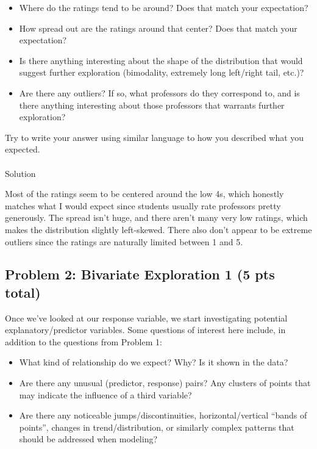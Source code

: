 \documentclass[
  letterpaper,
  DIV=11,
  numbers=noendperiod]{scrartcl}
\makeatletter
\let\oldparagraph\paragraph
\renewcommand{\paragraph}{
    \@ifstar
      \xxxParagraphStar
      \xxxParagraphNoStar
  }
\newcommand{\xxxParagraphStar}[1]{\oldparagraph*{#1}\mbox{}}
\newcommand{\xxxParagraphNoStar}[1]{\oldparagraph{#1}\mbox{}}
\providecommand{\tightlist}{%
  \setlength{\itemsep}{0pt}\setlength{\parskip}{0pt}}
\makeatother
\begin{document}
\begin{itemize}
\tightlist
\item
  Where do the ratings tend to be around? Does that match your
  expectation?
\item
  How spread out are the ratings around that center? Does that match
  your expectation?
\item
  Is there anything interesting about the shape of the distribution that
  would suggest further exploration (bimodality, extremely long
  left/right tail, etc.)?
\item
  Are there any outliers? If so, what professors do they correspond to,
  and is there anything interesting about those professors that warrants
  further exploration?
\end{itemize}

Try to write your answer using similar language to how you described
what you expected.

\paragraph{Solution}\label{solution-3}

Most of the ratings seem to be centered around the low 4s, which
honestly matches what I would expect since students usually rate
professors pretty generously. The spread isn't huge, and there aren't
many very low ratings, which makes the distribution slightly
left-skewed. There also don't appear to be extreme outliers since the
ratings are naturally limited between 1 and 5.

\subsection{Problem 2: Bivariate Exploration 1 (5 pts
total)}\label{problem-2-bivariate-exploration-1-5-pts-total}

Once we've looked at our response variable, we start investigating
potential explanatory/predictor variables. Some questions of interest
here include, in addition to the questions from Problem 1:

\begin{itemize}
\tightlist
\item
  What kind of relationship do we expect? Why? Is it shown in the data?
\item
  Are there any unusual (predictor, response) pairs? Any clusters of
  points that may indicate the influence of a third variable?
\item
  Are there any noticeable jumps/discontinuities, horizontal/vertical
  ``bands of points'', changes in trend/distribution, or similarly
  complex patterns that should be addressed when modeling?
\end{itemize}
\end{document}
